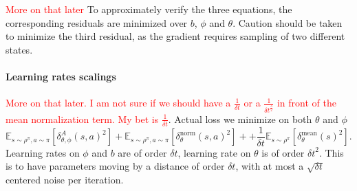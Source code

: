 \documentclass[11pt]{article}
\newcommand{\deltat}{{\delta t}}
\newcommand{\E}{\mathbb{E}}
\newcommand{\TODO}[1]{\textcolor{red}{#1}}
\begin{document}
\TODO{More on that later}
To approximately verify the three equations, the corresponding residuals are
minimized over $b$, $\phi$ and $\theta$. Caution should be taken to minimize
the third residual, as the gradient requires sampling of two different states.

\paragraph{Learning rates scalings}
\TODO{More on that later. I am not sure if we should have a $\frac{1}{\deltat}$
	or a $\frac{1}{\deltat^\frac{3}{2}}$ in front of the mean normalization
term. My bet is $\frac{1}{\deltat}$}.
Actual loss we minimize on both $\theta$ and $\phi$
\begin{equation}
	\E_{s \sim \rho^\pi, a \sim \pi}\left[\delta^A_{\theta, \phi}(s, a)^2\right] +
	\E_{s \sim \rho^\pi, a \sim \pi}\left[\delta^\text{norm}_{\theta}(s, a)^2\right] +
	+ \frac{1}{\deltat}\E_{s \sim \rho^\pi}\left[\delta^\text{mean}_{\theta}(s)^2\right].
\end{equation}
Learning rates on $\phi$ and $b$ are of order $\deltat$, learning rate on
$\theta$ is of order $\deltat^2$. This is to have parameters moving by a
distance of order $\deltat$, with at most a $\sqrt{\deltat}$ centered noise per
iteration.
\end{document}
